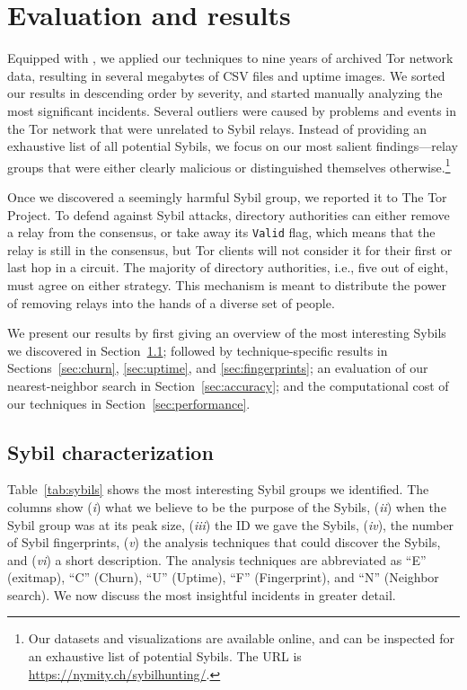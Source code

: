 \section{Evaluation and results}
\label{sec:results}
Equipped with \sys, we applied our techniques to nine years of archived Tor
network data, resulting in several megabytes of CSV files and uptime images.  We
sorted our results in descending order by severity, and started manually
analyzing the most significant incidents.  Several outliers were caused by
problems and events in the Tor network that were unrelated to Sybil relays.
Instead of providing an exhaustive list of all potential Sybils, we focus on our
most salient findings---relay groups that were either clearly malicious or
distinguished themselves otherwise.\footnote{Our datasets and visualizations are
available online, and can be inspected for an exhaustive list of potential
Sybils.  The URL is \url{https://nymity.ch/sybilhunting/}.}

Once we discovered a seemingly harmful Sybil group, we reported it to The Tor
Project.  To defend against Sybil attacks, directory authorities can either
remove a relay from the consensus, or take away its \texttt{Valid} flag, which
means that the relay is still in the consensus, but Tor clients will not
consider it for their first or last hop in a circuit.  The majority of directory
authorities, i.e., five out of eight, must agree on either strategy.  This
mechanism is meant to distribute the power of removing relays into the hands of
a diverse set of people.

We present our results by first giving an overview of the most interesting
Sybils we discovered in Section~\ref{sec:sybil_groups}; followed by
technique-specific results in Sections~\ref{sec:churn}, \ref{sec:uptime}, and
\ref{sec:fingerprints}; an evaluation of our nearest-neighbor search in
Section~\ref{sec:accuracy}; and the computational cost of our techniques in
Section~\ref{sec:performance}.

\subsection{Sybil characterization}
\label{sec:sybil_groups}
Table~\ref{tab:sybils} shows the most interesting Sybil groups we identified.
The columns show (\emph{i}) what we believe to be the purpose of the Sybils,
(\emph{ii}) when the Sybil group was at its peak size, (\emph{iii}) the ID we
gave the Sybils, (\emph{iv}), the number of Sybil fingerprints, (\emph{v}) the
analysis techniques that could discover the Sybils, and (\emph{vi}) a short
description.  The analysis techniques are abbreviated as ``E'' (exitmap), ``C''
(Churn), ``U'' (Uptime), ``F'' (Fingerprint), and ``N'' (Neighbor search).  We
now discuss the most insightful incidents in greater detail.

